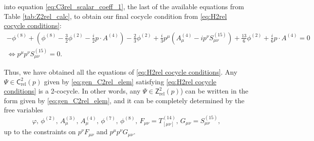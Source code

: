 \documentclass[11pt,reqno,a4paper,final]{amsart}
\theoremstyle{plain}
\theoremstyle{definition}
\newcommand{\Crel}{\mathsf{C}_{\mathrm{rel}}} %
\newcommand{\Zrel}{\mathsf{Z}_{\mathrm{rel}}}
\newcommand{\phisup}[1]{\phi^{(#1)}}
\newcommand{\Asup}[1]{A^{(#1)}}
\newcommand{\1}{\mathbb{1}}
\numberwithin{equation}{section}
\begin{document}
\begin{appendices}
\begin{enumerate}
\begin{enumerate}
    \end{enumerate} into equation \eqref{eq:C3rel_scalar_coeff_1}, the last of the available equations from Table \ref{tab:Z2rel_calc}, to obtain our final cocycle condition from \eqref{eq:H2rel cocycle conditions}:
    \begin{equation*}
    \begin{gathered}
        -\phisup{8} + (\phisup{8} - \tfrac32 \phisup{2} - \tfrac i2 p \cdot \Asup{4}) - \tfrac23 \phisup{2} + \tfrac i3 p^\mu (\Asup{4}_\mu - ip^\nu S^{(15)}_{\mu\nu}) + \tfrac{13}{6}  \phisup{2} + \tfrac i6 p \cdot \Asup{4} = 0 \\
        \iff \boxed{p^\mu p^\nu S^{(15)}_{\mu\nu} = 0.}
    \end{gathered}
    \end{equation*}
\end{enumerate}
Thus, we have obtained all the equations of \eqref{eq:H2rel cocycle conditions}. 
Any $\Psi\in\Crel^2(p)$ given by \eqref{eq:gen_C2rel_elem} satisfying \eqref{eq:H2rel cocycle conditions} is a 2-cocycle. In other words, any $\Psi \in \Zrel^2(p)$) can be written in the form given by \eqref{eq:gen_C2rel_elem}, and it can be completely determined by the free variables 
\begin{equation} \label{eq:free_var_Z2rel}
    \varphi,\, \phi^{(2)},\, A_\mu^{(3)},\, A_\mu^{(4)},\, \phi^{(7)},\, \phi^{(8)},\, F_{\mu\nu} = T_{[\mu\nu]}^{(14)},\, G_{\mu\nu} = S^{(15)}_{\mu\nu},
\end{equation}
up to the constraints on $p^\nu F_{\mu\nu}$ and $p^\mu p^\nu G_{\mu\nu}$. 


\end{appendices}
\end{document}
